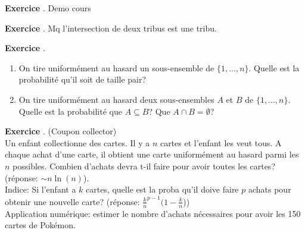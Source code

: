 \documentclass[10pt,a4paper]{article}
\newcounter{question}
\newcounter{exo}
\newenvironment{exo}{\vspace{0.5cm}\setcounter{question}{0}\addtocounter{exo}{1} \noindent \textbf{Exercice \theexo}. \normalsize }{\par}
\begin{document}
	\begin{exo}
		Demo cours
	\end{exo}

	\begin{exo}
		Mq l'intersection de deux tribus est une tribu.
	\end{exo}
	
	\begin{exo}
		\begin{enumerate}
			\item On tire uniformément au hasard un sous-ensemble de $\lbrace 1, ..., n \rbrace$. Quelle est la probabilité qu'il soit de taille pair? 
			\item On tire uniformément au hasard deux sous-ensembles $A$ et $B$ de $\lbrace 1, ..., n \rbrace$. Quelle est la probabilité que $A \subseteq B$? Que $A \cap B = \emptyset$?
		\end{enumerate}
	\end{exo}
	
	\begin{exo}
		(Coupon collector)\\
		Un enfant collectionne des cartes. Il y a $n$ cartes et l'enfant les veut tous. A chaque achat d'une carte, il obtient une carte uniformément au hasard parmi les $n$ possibles. Combien d'achats devra t-il faire pour avoir toutes les cartes? (réponse: $\sim n \ln(n)$).\\
		Indice: Si l'enfant a $k$ cartes, quelle est la proba qu'il doive faire $p$ achats pour obtenir une nouvelle carte? (réponse: $\frac{k}{n}^{p-1} (1 - \frac{k}{n}$))\\
		Application numérique: estimer le nombre d'achats nécessaires pour avoir les 150 cartes de Pokémon.
	\end{exo}
\end{document}
